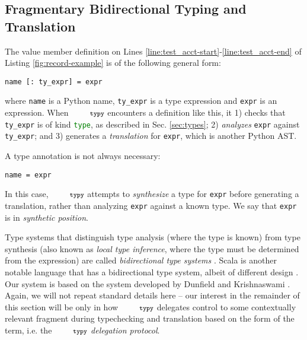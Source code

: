 \documentclass[10pt]{sigplanconf}
\newcommand{\typy}{\texttt{\footnotesize typy}}
\newcommand{\lip}[1]{\lstinline[language=Python,basicstyle=\ttfamily\footnotesize,morekeywords={with},deletendkeywords={tuple,buffer,map}]{#1}}
\newcommand{\li}[1]{\lip{#1}}
\begin{document}
\subsection{Fragmentary Bidirectional Typing and Translation}\label{sec:typechecking-and-translation}
The value member definition on Lines \ref{line:test_acct-start}-\ref{line:test_acct-end} of Listing \ref{fig:record-example} is of the following general form:
\begin{lstlisting}[numbers=none]
name [: ty_expr] = expr
\end{lstlisting}
where \lip{name} is a Python name, \lip{ty_expr} is a type expression and \lip{expr} is an expression. When $\typy$ encounters a definition like this, it 1) checks that \lip{ty_expr} is of kind \li{type}, as described in Sec. \ref{sec:types}; 2) \emph{analyzes} \lip{expr} against \lip{ty_expr}; and 3) generates a \emph{translation} for \lip{expr}, which is another Python AST.%

A type annotation is not always necessary:%
\begin{lstlisting}[numbers=none]
name = expr
\end{lstlisting}
In this case, $\typy$ attempts to \emph{synthesize} a type for \lip{expr} before generating a translation, rather than analyzing \lip{expr} against a known type. We say that \lip{expr} is in \emph{synthetic position}.

Type systems that distinguish type analysis (where the type is known) from type synthesis (also known as \emph{local type inference}, where the type must be determined from the expression) are called \emph{bidirectional type systems} \cite{Pierce:2000:LTI:345099.345100,bidi-tutorial}. Scala is another notable language that has a bidirectional type system, albeit of different design \cite{OdeZenZen01}. Our system is based on the system developed by Dunfield and Krishnaswami \cite{conf/icfp/DunfieldK13}. Again, we will not repeat standard details here -- our interest in the remainder of this section will be only in how $\typy$ delegates control  to some contextually relevant fragment during typechecking and translation based on the form of the term, i.e. the $\typy$ \emph{delegation protocol}. %
\end{document}
